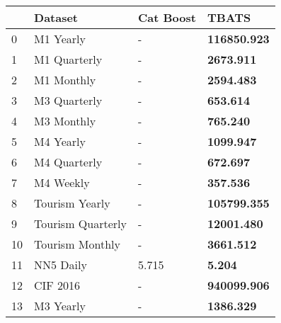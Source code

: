 \begin{tabular}{llll}
\toprule
 & Dataset & Cat Boost & TBATS \\
\midrule
0 & M1 Yearly & - & \textbf{116850.923} \\
1 & M1 Quarterly & - & \textbf{2673.911} \\
2 & M1 Monthly & - & \textbf{2594.483} \\
3 & M3 Quarterly & - & \textbf{653.614} \\
4 & M3 Monthly & - & \textbf{765.240} \\
5 & M4 Yearly & - & \textbf{1099.947} \\
6 & M4 Quarterly & - & \textbf{672.697} \\
7 & M4 Weekly & - & \textbf{357.536} \\
8 & Tourism Yearly & - & \textbf{105799.355} \\
9 & Tourism Quarterly & - & \textbf{12001.480} \\
10 & Tourism Monthly & - & \textbf{3661.512} \\
11 & NN5 Daily & 5.715 & \textbf{5.204} \\
12 & CIF 2016 & - & \textbf{940099.906} \\
13 & M3 Yearly & - & \textbf{1386.329} \\
\bottomrule
\end{tabular}
